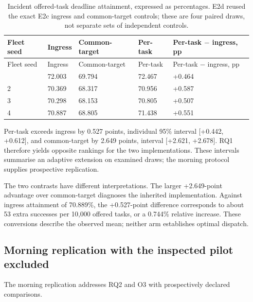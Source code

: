 \documentclass[12pt,a4paper]{article}
\begin{document}
\begingroup
\singlespacing\footnotesize\setlength{\tabcolsep}{3pt}
\begin{xltabular}{\textwidth}{@{}YYYYY@{}}
\caption[Incident attainment]{Incident offered-task deadline attainment, expressed as percentages. E2d reused the exact E2c ingress and common-target controls; these are four paired draws, not separate sets of independent controls.}\label{tab:4} \\
\toprule
Fleet seed & Ingress & Common-target & Per-task & Per-task \ensuremath{-} ingress, pp \\
\midrule\endfirsthead
\toprule
Fleet seed & Ingress & Common-target & Per-task & Per-task \ensuremath{-} ingress, pp \\
\midrule\endhead
\bottomrule{} & 72.003 & 69.794 & 72.467 & +0.464 \\
2 & 70.369 & 68.317 & 70.956 & +0.587 \\
3 & 70.298 & 68.153 & 70.805 & +0.507 \\
4 & 70.887 & 68.805 & 71.438 & +0.551 \\
\end{xltabular}
\endgroup

Per-task exceeds ingress by 0.527 points, individual 95\% interval [+0.442, +0.612], and common-target by 2.649 points, interval [+2.621, +2.678]. RQ1 therefore yields opposite rankings for the two implementations. These intervals summarise an adaptive extension on examined draws; the morning protocol supplies prospective replication.

The two contrasts have different interpretations. The larger +2.649-point advantage over common-target diagnoses the inherited implementation. Against ingress attainment of 70.889\%, the +0.527-point difference corresponds to about 53 extra successes per 10,000 offered tasks, or a 0.744\% relative increase. These conversions describe the observed mean; neither arm establishes optimal dispatch.

\FloatBarrier
\subsection{Morning replication with the inspected pilot excluded}\label{sec:3.3}

The morning replication addresses RQ2 and O3 with prospectively declared comparisons.
\end{document}
